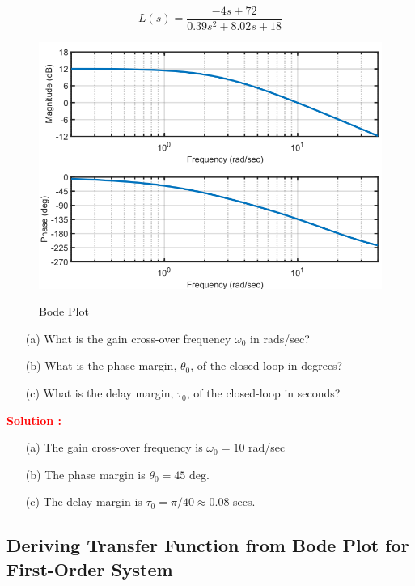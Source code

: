 \documentclass[12pt]{article}
\begin{document}
\begin{equation}
    L(s) = \frac{-4s + 72}{0.39 s^2 + 8.02 s + 18}
\end{equation}

\begin{figure}[h]
    \centering
    \includegraphics[width=\textwidth]{figs/6.4.png}
    \label{fig:bode-88}
    \caption{Bode Plot}
\end{figure}

\begin{itemize}
    \item[(a)] What is the gain cross-over frequency $\omega_0$ in rads/sec?
    \item[(b)] What is the phase margin, $\theta_0$, of the closed-loop in degrees?
    \item[(c)] What is the delay margin, $\tau_0$, of the closed-loop in seconds?
\end{itemize}

\textbf{\textcolor{red}{Solution :}}

\begin{itemize}
    \item [(a)] The gain cross-over frequency is $\omega_0 = 10$ rad/sec
    \item [(b)] The phase margin is $\theta_0 = 45 $ deg.
    \item [(c)] The delay margin is $\tau_0 = \pi/ 40 \approx 0.08$ secs.
\end{itemize}
\clearpage

\subsection{Deriving Transfer Function from Bode Plot for First-Order System}
\end{document}
